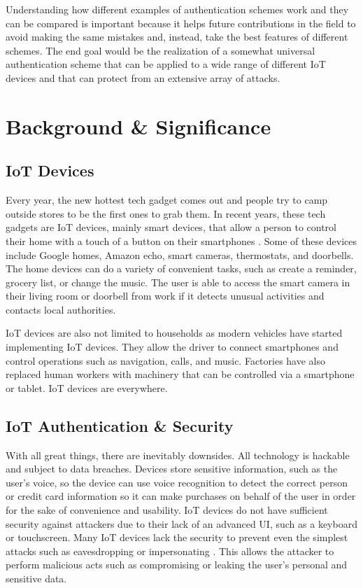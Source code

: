 \documentclass[10pt,twocolumn,letterpaper]{article}
\begin{document}
Understanding how different examples of authentication schemes work and they can be compared is important because it helps future contributions in the field to avoid making the same mistakes and, instead, take the best features of different schemes. The end goal would be the realization of a somewhat universal authentication scheme that can be applied to a wide range of different IoT devices and that can protect from an extensive array of attacks.

\section{Background \& Significance}

\subsection{IoT Devices}
Every year, the new hottest tech gadget comes out and people try to camp outside stores to be the first ones to grab them. In recent years, these tech gadgets are IoT devices, mainly smart devices, that allow a person to control their home with a touch of a button on their smartphones \cite{piano}. Some of these devices include Google homes, Amazon echo, smart cameras, thermostats, and doorbells. The home devices can do a variety of convenient tasks, such as create a reminder, grocery list, or change the music. The user is able to access the smart camera in their living room or doorbell from work if it detects unusual activities and contacts local authorities.


IoT devices are also not limited to households as modern vehicles have started implementing IoT devices. They allow the driver to connect smartphones and control operations such as navigation, calls, and music. Factories have also replaced human workers with machinery that can be controlled via a smartphone or tablet. IoT devices are everywhere.

\subsection{IoT Authentication \& Security}

With all great things, there are inevitably downsides. All technology is hackable and subject to data breaches. Devices store sensitive information, such as the user’s voice, so the device can use voice recognition to detect the correct person or credit card information so it can make purchases on behalf of the user in order for the sake of convenience and usability. IoT devices do not have sufficient security against attackers due to their lack of an advanced UI, such as a keyboard or touchscreen. Many IoT devices lack the security to prevent even the simplest attacks such as eavesdropping or impersonating \cite{proxmotion}. This allows the attacker to perform malicious acts such as compromising or leaking the user’s personal and sensitive data.
\end{document}
